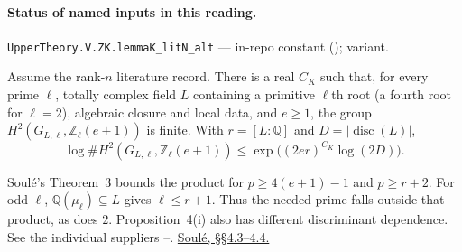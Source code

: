

\paragraph{Status of named inputs in this reading.}
\noindent\nolinkurl{UpperTheory.V.ZK.lemmaK_litN_alt} --- in-repo constant (); variant.\par

\begin{formalstatement}\label{sub:W05}
Assume the rank-$n$ literature record. There is a real $C_K$ such that,
for every prime $\ell$, totally complex field $L$ containing a primitive
$\ell$th root (a fourth root for $\ell=2$), algebraic closure and
local data, and $e\ge1$, the group $H^2(G_{L,\ell},\mathbb Z_\ell(e+1))$
is finite. With $r=[L:\mathbb Q]$ and $D=|\operatorname{disc}(L)|$,
\[
 \log\# H^2(G_{L,\ell},\mathbb Z_\ell(e+1))
 \le \exp\big((2er)^{C_K}\log(2D)\big).
\]
\end{formalstatement}
Soulé's Theorem~3 bounds the product for $p\ge4(e+1)-1$ and $p\ge r+2$.
For odd $\ell$, $\mathbb Q(\mu_\ell)\subseteq L$ gives $\ell\le r+1$.
Thus the needed prime falls outside that product, as does $2$.
Proposition~4(i) also has different discriminant dependence.
See the individual suppliers --.
\href{https://www.maths.tcd.ie/EMIS/journals/DMJDMV/vol-kato/soule.dm.pdf}{Soulé, §§4.3--4.4.}~\cite{r21-soule}
